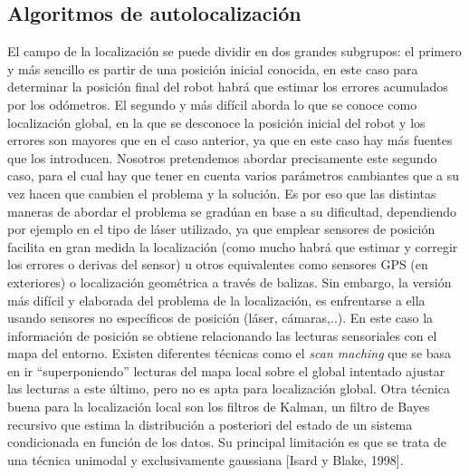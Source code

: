 \subsection{Algoritmos de autolocalización}
El campo de la localización se puede dividir en dos grandes subgrupos: el primero y más sencillo es partir de una posición inicial conocida, en este caso para determinar la posición final del robot habrá que estimar los errores acumulados por los odómetros. El segundo y más difícil aborda lo que se conoce como localización global, en la que se desconoce la posición inicial del robot y los errores son mayores que en el caso anterior, ya que en este caso hay más fuentes que los introducen. Nosotros pretendemos abordar precisamente este segundo caso, para el cual hay que tener en cuenta varios parámetros cambiantes que a su vez hacen que cambien el problema y la solución.
Es por eso que las distintas maneras de abordar el problema se gradúan en base a su dificultad, dependiendo por ejemplo en el tipo de láser utilizado, ya que emplear sensores de posición facilita en gran medida la localización (como mucho habrá que estimar y corregir los errores o derivas del sensor) u otros equivalentes como sensores GPS (en exteriores) o localización geométrica a través de balizas. Sin embargo, la versión más difícil y elaborada del problema de la localización, es enfrentarse a ella usando sensores no específicos de posición (láser, cámaras,..). En este caso la información de posición se obtiene relacionando las lecturas sensoriales con el mapa del entorno.
Existen diferentes técnicas como el \textit{scan maching} que se basa en ir “superponiendo” lecturas del mapa local sobre el global intentado ajustar las lecturas a este último, pero no es apta para localización global. Otra técnica buena para la localización local son los filtros de Kalman, un filtro de Bayes recursivo que estima la distribución a posteriori del estado de un sistema condicionada en función de los datos. Su principal limitación es que se trata de una técnica unimodal y exclusivamente gaussiana [Isard y Blake, 1998]. 
